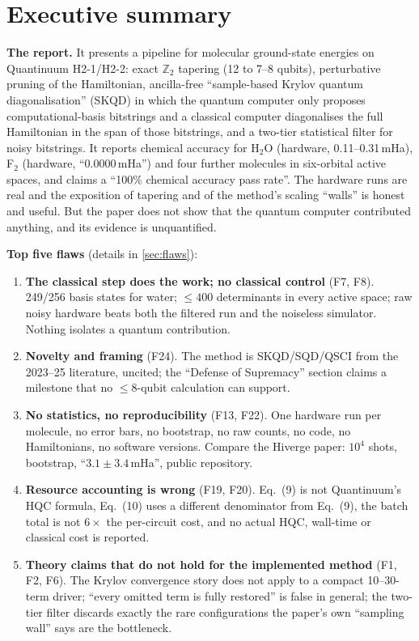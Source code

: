 \documentclass[11pt,a4paper]{article}
\begin{document}
\section*{Executive summary}
\textbf{The report.} It presents a pipeline for molecular ground-state energies on Quantinuum H2-1/H2-2: exact $\mathbb{Z}_2$ tapering (12 to 7--8 qubits), perturbative pruning of the Hamiltonian, ancilla-free ``sample-based Krylov quantum diagonalisation'' (SKQD) in which the quantum computer only proposes computational-basis bitstrings and a classical computer diagonalises the full Hamiltonian in the span of those bitstrings, and a two-tier statistical filter for noisy bitstrings. It reports chemical accuracy for H$_2$O (hardware, 0.11--0.31\,mHa), F$_2$ (hardware, ``0.0000\,mHa'') and four further molecules in six-orbital active spaces, and claims a ``100\% chemical accuracy pass rate''. The hardware runs are real and the exposition of tapering and of the method's scaling ``walls'' is honest and useful. But the paper does not show that the quantum computer contributed anything, and its evidence is unquantified.

\textbf{Top five flaws} (details in \cref{sec:flaws}):
\begin{enumerate}
\item \textbf{The classical step does the work; no classical control} (F7, F8). 249/256 basis states for water; $\le 400$ determinants in every active space; raw noisy hardware beats both the filtered run and the noiseless simulator. Nothing isolates a quantum contribution.
\item \textbf{Novelty and framing} (F24). The method is SKQD/SQD/QSCI from the 2023--25 literature, uncited; the ``Defense of Supremacy'' section claims a milestone that no $\le 8$-qubit calculation can support.
\item \textbf{No statistics, no reproducibility} (F13, F22). One hardware run per molecule, no error bars, no bootstrap, no raw counts, no code, no Hamiltonians, no software versions. Compare the Hiverge paper: $10^4$ shots, bootstrap, ``$3.1 \pm 3.4$\,mHa'', public repository.
\item \textbf{Resource accounting is wrong} (F19, F20). Eq.~(9) is not Quantinuum's HQC formula, Eq.~(10) uses a different denominator from Eq.~(9), the batch total is not $6\times$ the per-circuit cost, and no actual HQC, wall-time or classical cost is reported.
\item \textbf{Theory claims that do not hold for the implemented method} (F1, F2, F6). The Krylov convergence story does not apply to a compact 10--30-term driver; ``every omitted term is fully restored'' is false in general; the two-tier filter discards exactly the rare configurations the paper's own ``sampling wall'' says are the bottleneck.
\end{enumerate}
\end{document}
